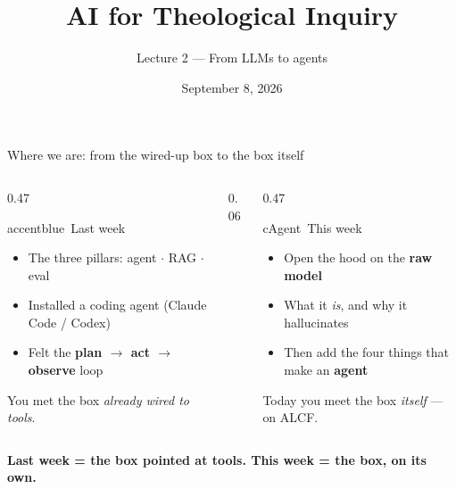 


\title{AI for Theological Inquiry}
\subtitle{Lecture 2 — From LLMs to agents}
\date{September 8, 2026}





\begin{frame}{Where we are: from the wired-up box to the box itself}
  \begin{columns}[c, totalwidth=\textwidth]
    \begin{column}{0.47\textwidth}
      \begin{featbox}{accentblue}{\faCheckCircle\ Last week}
        \small
        \begin{itemize}
          \item The three pillars: agent $\cdot$ RAG $\cdot$ eval
          \item Installed a coding agent (Claude Code / Codex)
          \item Felt the \textbf{plan $\to$ act $\to$ observe} loop
        \end{itemize}
        {\scriptsize\color{midgray}You met the box \emph{already wired to tools}.}
      \end{featbox}
    \end{column}
    \begin{column}{0.06\textwidth}\end{column}
    \begin{column}{0.47\textwidth}
      \begin{featbox}{cAgent}{\faSearch\ This week}
        \small
        \begin{itemize}
          \item Open the hood on the \textbf{raw model}
          \item What it \emph{is}, and why it hallucinates
          \item Then add the four things that make an \textbf{agent}
        \end{itemize}
        {\scriptsize\color{midgray}Today you meet the box \emph{itself} --- on ALCF.}
      \end{featbox}
    \end{column}
  \end{columns}
  \vspace{10pt}
  \begin{center}\small\color{labnavy}\bfseries
    Last week = the box pointed at tools. This week = the box, on its own.\end{center}
\end{frame}

